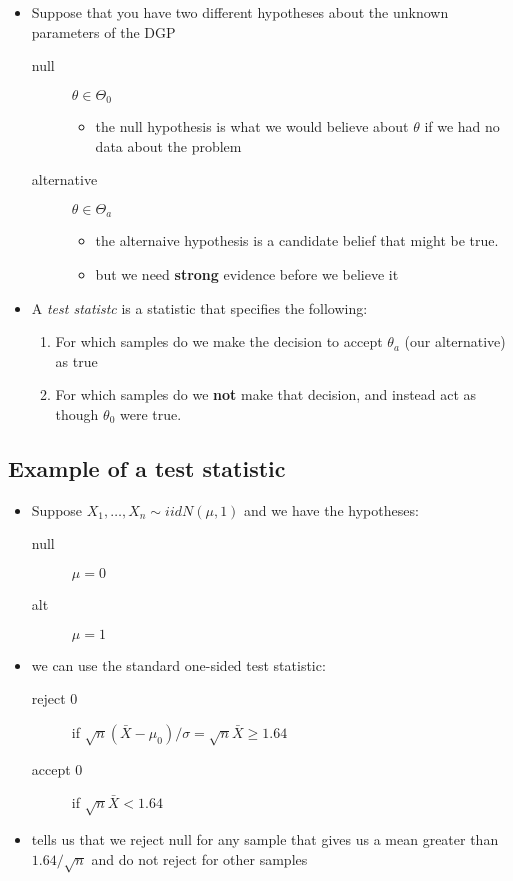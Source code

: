 \begin{itemize}
\item Suppose that you have two different hypotheses about the
       unknown parameters of the DGP
\begin{description}
\item[null] $\theta \in \Theta_0$
\begin{itemize}
\item the null hypothesis is what we would believe about $\theta$ if we
           had no data about the problem
\end{itemize}
\item[alternative] $\theta \in \Theta_a$
\begin{itemize}
\item the alternaive hypothesis is a candidate belief that might be true.
\item but we need \textbf{strong} evidence before we believe it
\end{itemize}
\end{description}
\item A \emph{test statistc} is a statistic that specifies the following:
\begin{enumerate}
\item For which samples do we make the decision to accept $\theta_a$
          (our alternative) as true
\item For which samples do we \textbf{not} make that decision, and instead
          act as though $\theta_0$ were true.
\end{enumerate}
\end{itemize}
\subsection{Example of a test statistic}
\label{sec-2-2}

\begin{itemize}
\item Suppose $X_1,\dots,X_n \sim iid N(\mu,1)$ and we have the hypotheses:
\begin{description}
\item[null] $\mu = 0$
\item[alt] $\mu = 1$
\end{description}
\item we can use the standard one-sided test statistic:
\begin{description}
\item[reject 0] if $\sqrt{n} (\bar X - \mu_0) / \sigma = \sqrt{n}
                     \bar X \geq 1.64$
\item[accept 0] if $\sqrt{n} \bar X < 1.64$
\end{description}
\item tells us that we reject null for any sample that gives us a mean
       greater than $1.64 / \sqrt{n}$ and do not reject for other
       samples
\end{itemize}
